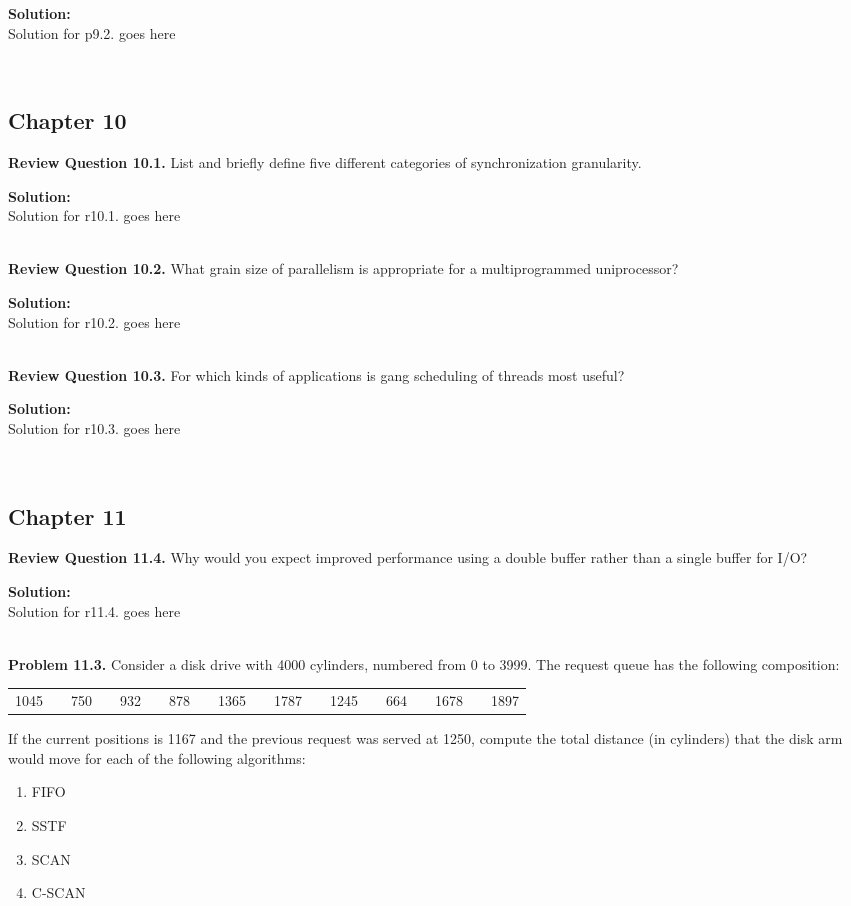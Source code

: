 \documentclass[12pt]{article}
\newcommand{\Problem}[1]{%
	\textbf{Problem #1.}%
}
\newcommand{\Review}[1]{%
	\textbf{Review Question #1.}%
}
\newcommand\Solution{%
	\noindent \textbf{Solution:}\\%
}
\begin{document}
\Solution Solution for p9.2. goes here

~\\
\subsection*{Chapter 10}

\Review{10.1} List and briefly define five different categories of synchronization granularity.

\Solution Solution for r10.1. goes here

~\\
\Review{10.2} What grain size of parallelism is appropriate for a multiprogrammed uniprocessor?

\Solution Solution for r10.2. goes here

~\\
\Review{10.3} For which kinds of applications is gang scheduling of threads most useful?

\Solution Solution for r10.3. goes here

~\\
\subsection*{Chapter 11}

\Review{11.4} Why would you expect improved performance using a double buffer rather than a single buffer for I/O?

\Solution Solution for r11.4. goes here

~\\
\Problem{11.3} Consider a disk drive with 4000 cylinders, numbered from 0 to 3999. The request queue has the following composition:
	\begin{table}[H]
		\centering
		\begin{tabular}{llcllllllllllllllll}
			1045 &  & 750 &  & 932 &  & 878 &  & 1365 &  & 1787 &  & 1245 &  & 664 &  & 1678 &  & 1897
		\end{tabular}
	\end{table}
	If the current positions is 1167 and the previous request was served at 1250, compute the total distance (in cylinders) that the disk arm would move for each of the following algorithms:
	\begin{enumerate}[label=\alph*:]
		\item FIFO
		\item SSTF
		\item SCAN
		\item C-SCAN
	\end{enumerate}
\end{document}
